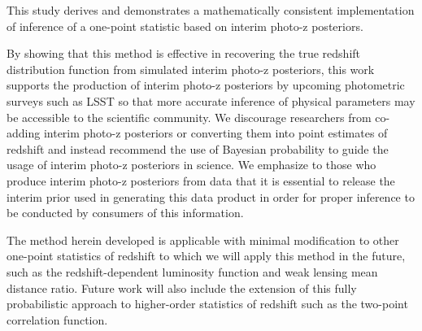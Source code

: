 \documentclass[preprint]{aastex}
\begin{document}
This study derives and demonstrates a mathematically consistent implementation 
of inference of a one-point statistic based on interim photo-z posteriors.  

By showing that this method is effective in recovering the true redshift 
distribution function from simulated interim photo-z posteriors, this work 
supports the production of interim photo-z posteriors by upcoming photometric 
surveys such as LSST so that more accurate inference of physical parameters may 
be accessible to the scientific community.  We discourage researchers from 
co-adding interim photo-z posteriors or converting them into point estimates of 
redshift and instead recommend the use of Bayesian probability to guide the 
usage of interim photo-z posteriors in science.  We emphasize to those who 
produce interim photo-z posteriors from data that it is essential to release 
the interim prior used in generating this data product in order for proper 
inference to be conducted by consumers of this information.

The method herein developed is applicable with minimal modification to other 
one-point statistics of redshift to which we will apply this method in the 
future, such as the redshift-dependent luminosity function and weak lensing 
mean distance ratio.  Future work will also include the extension of this fully 
probabilistic approach to higher-order statistics of redshift such as the 
two-point correlation function.
\end{document}
